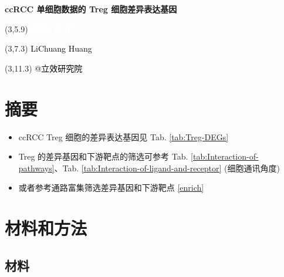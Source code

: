 \documentclass[
]{article}
\author{}
\date{\vspace{-2.5em}}
\providecommand{\tightlist}{%
  \setlength{\itemsep}{0pt}\setlength{\parskip}{0pt}}
\begin{document}
\begin{titlepage} 
\begin{center} \textbf{\Huge ccRCC 单细胞数据的
Treg 细胞差异表达基因} \vspace{4em}
\begin{textblock}{10}(3,5.9) \huge
\textbf{\textcolor{white}{2023-12-05}}
\end{textblock} \begin{textblock}{10}(3,7.3)
\Large \textcolor{black}{LiChuang Huang}
\end{textblock} \begin{textblock}{10}(3,11.3)
\Large \textcolor{black}{@立效研究院}
\end{textblock} \end{center} \end{titlepage}
\restoregeometry


\tableofcontents

\listoffigures

\listoftables

\newpage


\hypertarget{abstract}{%
\section{摘要}\label{abstract}}

\begin{itemize}
\tightlist
\item
  ccRCC Treg 细胞的差异表达基因见 Tab. \ref{tab:Treg-DEGs}
\item
  Treg 的差异基因和下游靶点的筛选可参考 Tab. \ref{tab:Interaction-of-pathways}、Tab. \ref{tab:Interaction-of-ligand-and-receptor} (细胞通讯角度)
\item
  或者参考通路富集筛选差异基因和下游靶点 \ref{enrich}
\end{itemize}

\hypertarget{methods}{%
\section{材料和方法}\label{methods}}

\hypertarget{ux6750ux6599}{%
\subsection{材料}\label{ux6750ux6599}}
\end{document}

